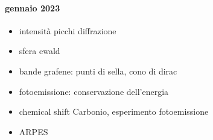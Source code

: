 \documentclass[../main.tex]{subfiles}
\begin{document}
\paragraph{gennaio 2023}
\begin{itemize}

\item intensità picchi diffrazione
\item sfera ewald
\item bande grafene: punti di sella, cono di dirac
\item fotoemissione: conservazione dell'energia
\item chemical shift Carbonio, esperimento fotoemissione
\item ARPES

\end{itemize}
\end{document}
